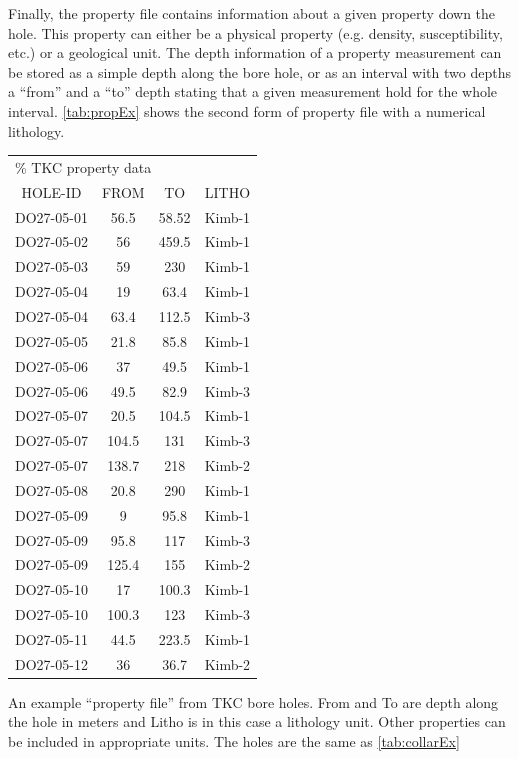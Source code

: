 Finally, the property file contains information about a given property down the hole. This property can either be a physical property (e.g. density, susceptibility, etc.) or a geological unit. The depth information of a property measurement can be stored as a simple depth along the bore hole, or as an interval with two depths a ``from'' and a ``to'' depth stating that a given measurement hold for the whole interval. \autoref{tab:propEx} shows the second form of property file with a numerical lithology.

\begin{fileExample}
\begin{tabular}{|cccc|}
\hline
\multicolumn{4}{|l|}{\% TKC property data} \\
HOLE-ID & FROM & TO & LITHO  \\
DO27-05-01 & 56.5 & 58.52 & Kimb-1 \\
DO27-05-02 & 56 & 459.5 & Kimb-1 \\
DO27-05-03 & 59 & 230 & Kimb-1 \\
DO27-05-04 & 19 & 63.4 & Kimb-1 \\
DO27-05-04 & 63.4 & 112.5 & Kimb-3 \\
DO27-05-05 & 21.8 & 85.8 & Kimb-1 \\
DO27-05-06 & 37 & 49.5 & Kimb-1 \\
DO27-05-06 & 49.5 & 82.9 & Kimb-3 \\
DO27-05-07 & 20.5 & 104.5 & Kimb-1 \\
DO27-05-07 & 104.5 & 131 & Kimb-3 \\
DO27-05-07 & 138.7 & 218 & Kimb-2 \\
DO27-05-08 & 20.8 & 290 & Kimb-1 \\
DO27-05-09 & 9 & 95.8 & Kimb-1 \\
DO27-05-09 & 95.8 & 117 & Kimb-3 \\
DO27-05-09 & 125.4 & 155 & Kimb-2 \\
DO27-05-10 & 17 & 100.3 & Kimb-1 \\
DO27-05-10 & 100.3 & 123 & Kimb-3 \\
DO27-05-11 & 44.5 & 223.5 & Kimb-1 \\
DO27-05-12 & 36 & 36.7 & Kimb-2 \\
\hline
\end{tabular}
\caption{An example ``property file'' from TKC bore holes. From and To are depth along the hole in meters and Litho is in this case a lithology unit. Other properties can be included in appropriate units. The holes are the same as \autoref{tab:collarEx}}
\label{tab:propEx}
\end{fileExample}

